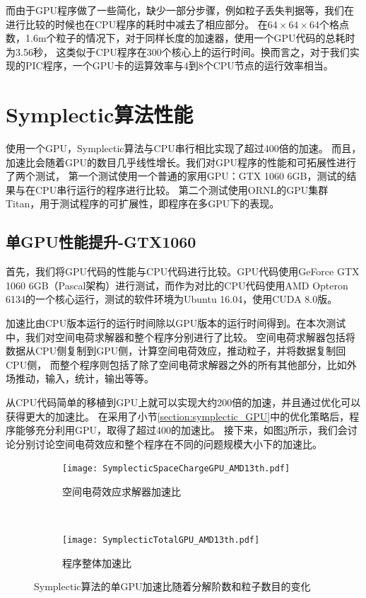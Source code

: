 而由于GPU程序做了一些简化，缺少一部分步骤，例如粒子丢失判据等，我们在进行比较的时候也在CPU程序的耗时中减去了相应部分。
在$64 \times 64 \times 64$个格点数，1.6m个粒子的情况下，对于同样长度的加速器，使用一个GPU代码的总耗时为3.56秒，
这类似于CPU程序在300个核心上的运行时间。换而言之，对于我们实现的PIC程序，一个GPU卡的运算效率与4到8个CPU节点的运行效率相当。


\section{Symplectic算法性能}        \label{section:Symplectic_performance}
使用一个GPU，Symplectic算法与CPU串行相比实现了超过400倍的加速。
而且，加速比会随着GPU的数目几乎线性增长。我们对GPU程序的性能和可拓展性进行了两个测试，
第一个测试使用一个普通的家用GPU：GTX 1060 6GB，测试的结果与在CPU串行运行的程序进行比较。
第二个测试使用ORNL的GPU集群Titan，用于测试程序的可扩展性，即程序在多GPU下的表现。

\subsection{单GPU性能提升-GTX1060}
首先，我们将GPU代码的性能与CPU代码进行比较。GPU代码使用GeForce GTX 1060 6GB（Pascal架构）进行测试，而作为对比的CPU代码使用AMD Opteron 6134的一个核心运行，测试的软件环境为Ubuntu 16.04，使用CUDA 8.0版。

加速比由CPU版本运行的运行时间除以GPU版本的运行时间得到。在本次测试中，我们对空间电荷求解器和整个程序分别进行了比较。
空间电荷求解器包括将数据从CPU侧复制到GPU侧，计算空间电荷效应，推动粒子，并将数据复制回CPU侧，
而整个程序则包括了除了空间电荷求解器之外的所有其他部分，比如外场推动，输入，统计，输出等等。

从CPU代码简单的移植到GPU上就可以实现大约200倍的加速，并且通过优化可以获得更大的加速比。
在采用了小节\ref{section:symplectic_GPU}中的优化策略后，程序能够充分利用GPU，取得了超过400的加速比。
接下来，如图\ref{fig:OneGPU}所示，我们会讨论分别讨论空间电荷效应和整个程序在不同的问题规模大小下的加速比。

\begin{figure}[!htb]
    \centering
    \begin{subfigure}[b]{0.9\textwidth}
        \texttt{[image: SymplecticSpaceChargeGPU\_AMD13th.pdf]}
        \caption{空间电荷效应求解器加速比}
        \label{fig:SCOpt}
    \end{subfigure}
    \quad
    ~ %
    \begin{subfigure}[b]{0.9\textwidth}
        \texttt{[image: SymplecticTotalGPU\_AMD13th.pdf]}
        \caption{程序整体加速比}
        \label{fig:TotalOpt}
    \end{subfigure}
    \caption{Symplectic算法的单GPU加速比随着分解阶数和粒子数目的变化}\label{fig:OneGPU}
\end{figure}


